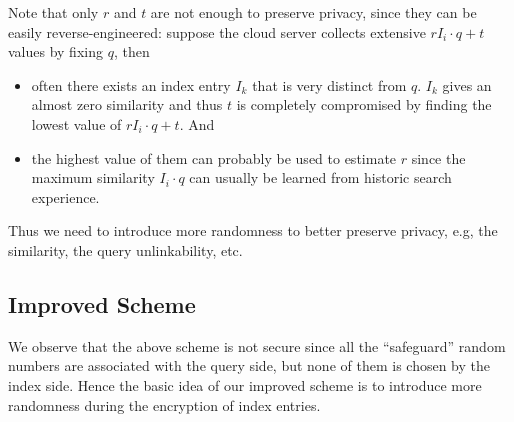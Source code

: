 \documentclass{IEEEtran}
\begin{document}
Note that only $r$ and $t$ are not enough to preserve privacy, since they can be easily reverse-engineered: suppose the cloud server collects extensive $rI_i\cdot q+t$ values by fixing $q$, then
\begin{itemize}
\item often there exists an index entry $I_k$ that is very distinct from $q$. $I_k$ gives an almost zero similarity and thus $t$ is completely compromised by finding the lowest value of $rI_i\cdot q+t$. And
\item the highest value of them can probably be used to estimate $r$ since the maximum similarity $I_i\cdot q$ can usually be learned from historic search experience. 
\end{itemize}
Thus we need to introduce more randomness to better preserve privacy, e.g, the similarity, the query unlinkability, etc.

\subsection{Improved Scheme}
We observe that the above scheme is not secure since all the ``safeguard'' random numbers are associated with the query side, but none of them is chosen by the index side. Hence the basic idea of our improved scheme is to introduce more randomness during the encryption of index entries.
\end{document}
